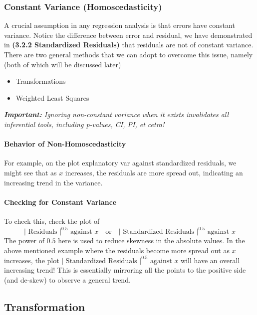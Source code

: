 \documentclass[11pt]{article}
\begin{document}
\subsubsection{Constant Variance (Homoscedasticity)}
A crucial assumption in any regression analysis is that errors have constant variance. \color{BurntOrange} Notice the difference between error and residual, we have demonstrated in \textbf{(3.2.2 Standardized Residuals)} that residuals are not of constant variance. \color{Black} There are two general methods that we can adopt to overcome this issue, namely (both of which will be discussed later)
\begin{itemize}
    \item Transformations
    \item Weighted Least Squares
\end{itemize}
\color{Red}
\textit{\textbf{Important:} Ignoring non-constant variance when it exists invalidates all inferential tools, including p-values, CI, PI, et cetra!}
\color{Black}

\paragraph{Behavior of Non-Homoscedasticity} For example, on the plot explanatory var against standardized residuals, we might see that as $x$ increases, the residuals are more spread out, indicating an increasing trend in the variance. 

\paragraph{Checking for Constant Variance} To check this, check the plot of
\begin{equation*}
    |\text{ Residuals }|^{0.5} \text { against } x \quad \text{or} \quad |\text { Standardized Residuals }|^{0.5} \text { against } x
\end{equation*}
The power of $0.5$ here is used to reduce skewness in the absolute values. In the above mentioned example where the residuals become more spread out as $x$ increases, the plot $|\text { Standardized Residuals }|^{0.5} \text { against } x$ will have an overall increasing trend! \color{BurntOrange} This is essentially mirroring all the points to the positive side (and de-skew) to observe a general trend. \color{Black}

\subsection{Transformation}
\end{document}

